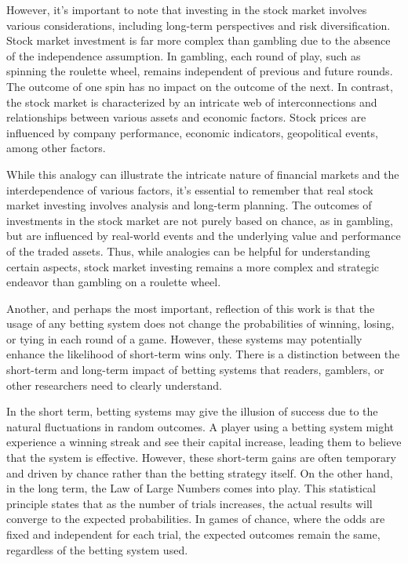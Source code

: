 \documentclass[11pt,twoside]{article}
\numberwithin{Theorem}{section}
\numberwithin{Definition}{section}
\numberwithin{Lemma}{section}
\numberwithin{Algorithm}{section}
\numberwithin{equation}{section}
\begin{document}
However, it's important to note that investing in the stock market involves various considerations, including long-term perspectives and risk diversification. Stock market investment is far more complex than gambling due to the absence of the independence assumption. In gambling, each round of play, such as spinning the roulette wheel, remains independent of previous and future rounds. The outcome of one spin has no impact on the outcome of the next. In contrast, the stock market is characterized by an intricate web of interconnections and relationships between various assets and economic factors. Stock prices are influenced by company performance, economic indicators, geopolitical events, among other factors.

While this analogy can illustrate the intricate nature of financial markets and the interdependence of various factors, it's essential to remember that real stock market investing involves analysis and long-term planning. The outcomes of investments in the stock market are not purely based on chance, as in gambling, but are influenced by real-world events and the underlying value and performance of the traded assets. Thus, while analogies can be helpful for understanding certain aspects, stock market investing remains a more complex and strategic endeavor than gambling on a roulette wheel.

Another, and perhaps the most important, reflection of this work is that the usage of any betting system does not change the probabilities of winning, losing, or tying in each round of a game. However, these systems may potentially enhance the likelihood of short-term wins only. There is a distinction between the short-term and long-term impact of betting systems that readers, gamblers, or other researchers need to clearly understand.

In the short term, betting systems may give the illusion of success due to the natural fluctuations in random outcomes. A player using a betting system might experience a winning streak and see their capital increase, leading them to believe that the system is effective. However, these short-term gains are often temporary and driven by chance rather than the betting strategy itself. On the other hand, in the long term, the Law of Large Numbers comes into play. This statistical principle states that as the number of trials increases, the actual results will converge to the expected probabilities. In games of chance, where the odds are fixed and independent for each trial, the expected outcomes remain the same, regardless of the betting system used.
\end{document}
